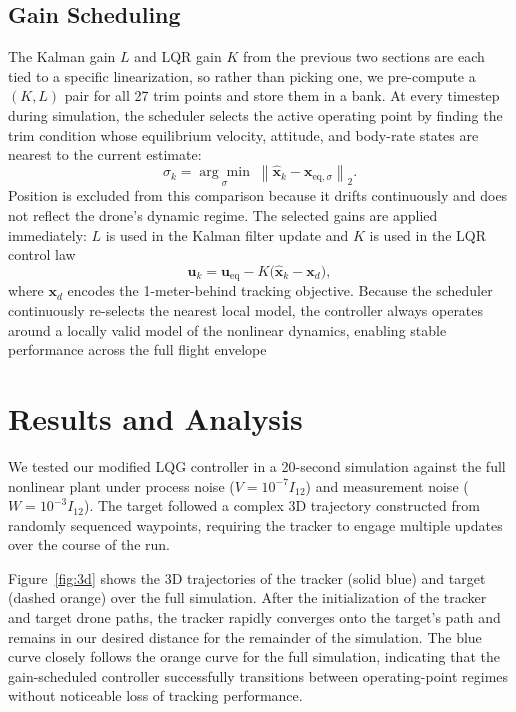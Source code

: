 \documentclass[11pt]{amsart}
\begin{document}
\subsection{Gain Scheduling}

The Kalman gain $L$ and LQR gain $K$ from the previous two sections are each tied to a specific linearization, so rather than picking one, we pre-compute a $(K, L)$ pair for all 27 trim points and store them in a bank. At every timestep during simulation, the scheduler selects the active operating point by finding the trim condition whose equilibrium velocity, attitude, and body-rate states are nearest to the current estimate:
\[
\sigma_k = \underset{\sigma}{\arg\min}\;\left\|\hat{\mathbf{x}}_k - \mathbf{x}_{\mathrm{eq},\sigma}\right\|_2.
\]
Position is excluded from this comparison because it drifts continuously and does not reflect the drone's dynamic regime. The selected gains are applied immediately: $L$ is used in the Kalman filter update and $K$ is used in the LQR control law
\[
\mathbf{u}_k = \mathbf{u}_{\mathrm{eq}} - K\bigl(\hat{\mathbf{x}}_k - \mathbf{x}_d\bigr),
\]
where $\mathbf{x}_d$ encodes the 1-meter-behind tracking objective. Because the scheduler continuously re-selects the nearest local model, the controller always operates around a locally valid model of the nonlinear dynamics, enabling stable performance across the full flight envelope



\section{\textbf{Results and Analysis}}

We tested our modified LQG controller in a 20-second simulation against the full nonlinear plant under process noise ($V = 10^{-7}I_{12}$) and measurement noise ($W = 10^{-3}I_{12}$). The target followed a complex 3D trajectory constructed from randomly sequenced waypoints, requiring the tracker to engage multiple updates over the course of the run.

Figure~\ref{fig:3d} shows the 3D trajectories of the tracker (solid blue) and target (dashed orange) over the full simulation. After the initialization of the tracker and target drone paths, the tracker rapidly converges onto the target's path and remains in our desired distance for the remainder of the simulation. The blue curve closely follows the orange curve for the full simulation, indicating that the gain-scheduled controller successfully transitions between operating-point regimes without noticeable loss of tracking performance.
\end{document}
